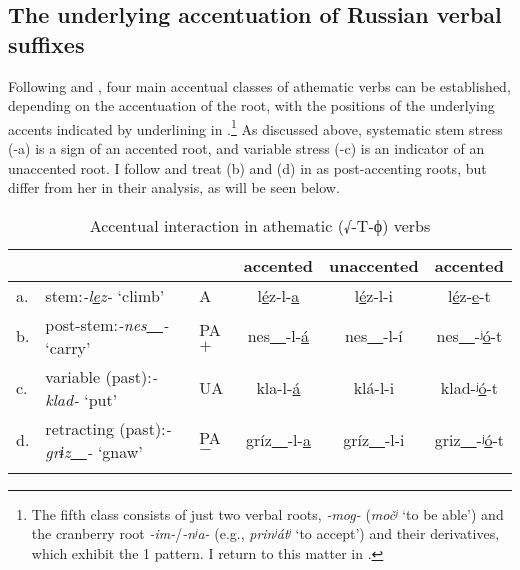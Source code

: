 \documentclass[output=paper,colorlinks,citecolor=black,koreanfont]{langscibook}
\begin{document}
\subsection{The underlying accentuation of Russian verbal suffixes}\label{mat:subsec:URofSuffixes}
\largerpage[2]

Following \citet{Halle1973} and \citet{Melvold1989}, four main accentual classes of athematic verbs can be established, depending on the accentuation of the root, with the positions of the underlying accents indicated by underlining in .\footnote{\label{mat:fn:FifthClass}The fifth class consists of just two verbal roots, \textit{-mog-} (\textit{močʲ} ‘to be able’) and the cranberry root \textit{-im-}/\textit{-nʲa-} (e.g., \textit{prinʲátʲ} ‘to accept’) and their derivatives, which exhibit the {1\SG} pattern. I return to this matter in .} As discussed above, systematic stem stress (-a) is a sign of an accented root, and variable stress (-c) is an indicator of an unaccented root. I follow \citet{Melvold1989} and treat (b) and (d) in  as post-accenting roots, but differ from her in their analysis, as will be seen below.
\clearpage

\begin{table}
\caption{Accentual interaction in athematic (√-T-ϕ) verbs}
\label{mat:tab:InteractionAthematic}
 \begin{tabularx}{.95\textwidth}{lL{2.75cm}lCCC} 
  \lsptoprule
    &&&accented &unaccented\linebreak{\PST-\PL} &accented\linebreak{\PST-3\SG}   \\
  \midrule
    a.  &stem:\newline\textit{-l\ul{e}z-} ‘climb’ &A
        &l\ul{é}z-l-\ul{a}    &l\ul{é}z-l-i    &l\ul{é}z-\ul{e}-t    \\\addlinespace[5pt]
    b.  &post-stem:\newline\textit{-nes\ul{~~}-} ‘carry’ &PA$+$
        &nes\ul{~~}-l-\ul{á}   &nes\ul{~~}-l-í     &nes\ul{~~}-ʲ\ul{ó}-t   \\\addlinespace[5pt]
    c.  &variable (past):\newline\textit{-klad-} ‘put’ &UA
        &kla-l-\ul{á}    &klá-l-i    &klad-ʲ\ul{ó}-t   \\\addlinespace[5pt]
    d.  &retracting (past):\newline\textit{-grɨz\ul{~~}-} ‘gnaw’ &PA$-$
        &gríz\ul{~~}-l-\ul{a}  &gríz\ul{~~}-l-i  &griz\ul{~~}-ʲ\ul{ó}-t   \\
  \lspbottomrule
 \end{tabularx}
\end{table}
\end{document}
